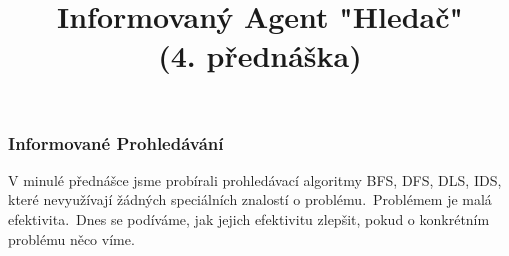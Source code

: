 \documentclass[red,handout,professionalfont]{beamer}
\title[]{Informovaný Agent "Hledač" \\ (4. přednáška)}
\date[]{}
\theoremstyle{definition}
\newcommand{\0}{\mbox{${\bf 0}$}}
\begin{document}



\begin{frame}{} \titlepage
\end{frame}

\begin{frame}\frametitle{Informované Prohledávání}
V minulé přednášce jsme probírali prohledávací algoritmy BFS, DFS, DLS, IDS,
které nevyužívají žádných speciálních znalostí o problému.\pause\ Problémem
je malá efektivita.\pause\ Dnes se podíváme, jak jejich efektivitu zlepšit, pokud
o konkrétním problému něco víme.
\end{frame}
\end{document}

